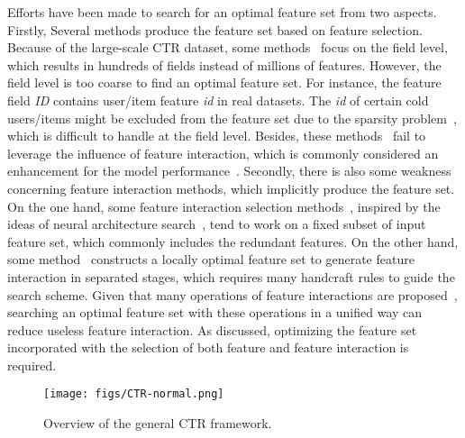 \documentclass[sigconf]{acmart}
\begin{document}
Efforts have been made to search for an optimal feature set from two aspects. Firstly, Several methods produce the feature set based on feature selection. Because of the large-scale CTR dataset, some methods~\cite{LASSO, LPFS, AutoField} focus on the field level, which results in hundreds of fields instead of millions of features. However, the field level is too coarse to find an optimal feature set. For instance, the feature field \textit{ID} contains user/item feature \textit{id} in real datasets. The \textit{id} of certain cold users/items might be excluded from the feature set due to the sparsity problem~\cite{Cold-start}, which is difficult to handle at the field level. Besides, these methods~\cite{AdaFS, LPFS} fail to leverage the influence of feature interaction, which is commonly considered an enhancement for the model performance~\cite{OptInter,fuxictr}. Secondly, there is also some weakness concerning feature interaction methods, which implicitly produce the feature set. On the one hand, some feature interaction selection methods~\cite{AutoFIS, AutoFeature, OptInter}, inspired by the ideas of neural architecture search~\cite{DARTS, NAO}, tend to work on a fixed subset of input feature set, which commonly includes the redundant features. On the other hand, some method~\cite{AutoCross} constructs a locally optimal feature set to generate feature interaction in separated stages, which requires many handcraft rules to guide the search scheme. Given that many operations of feature interactions are proposed~\cite{DCN, DeepFM, IPNN}, searching an optimal feature set with these operations in a unified way can reduce useless feature interaction. As discussed, optimizing the feature set incorporated with the selection of both feature and feature interaction is required.

\begin{figure}[!htbp]
    \centering
    \texttt{[image: figs/CTR-normal.png]}
    \vspace{-10pt}
    \caption{Overview of the general CTR framework.}
    \vspace{-10pt}
    \label{fig:normal}
\end{figure}
\end{document}
